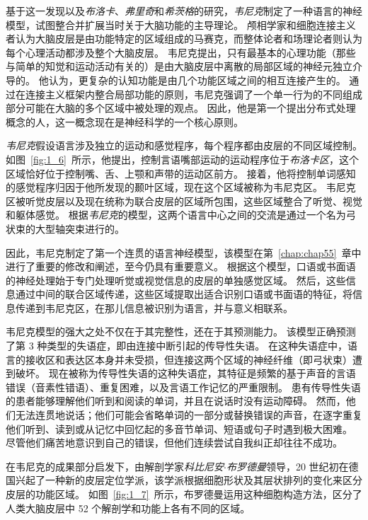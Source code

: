 基于这一发现以及\textit{布洛卡}、\textit{弗里奇}和\textit{希茨格}的研究，\textit{韦尼克}制定了一种语言的神经模型，试图整合并扩展当时关于大脑功能的主导理论。
颅相学家和细胞连接主义者认为大脑皮层是由功能特定的区域组成的马赛克，而整体论者和场理论者则认为每个心理活动都涉及整个大脑皮层。
韦尼克提出，只有最基本的心理功能（那些与简单的知觉和运动活动有关的）是由大脑皮层中离散的局部区域的神经元独立介导的。
他认为，更复杂的认知功能是由几个功能区域之间的相互连接产生的。
通过在连接主义框架内整合局部功能的原则，韦尼克强调了一个单一行为的不同组成部分可能在大脑的多个区域中被处理的观点。
因此，他是第一个提出分布式处理概念的人，这一概念现在是神经科学的一个核心原则。




\textit{韦尼克}假设语言涉及独立的运动和感觉程序，每个程序都由皮层的不同区域控制。
如图~\ref{fig:1_6}~所示，他提出，控制言语嘴部运动的运动程序位于\textit{布洛卡区}，这个区域恰好位于控制嘴、舌、上颚和声带的运动区前方。
接着，他将控制单词感知的感觉程序归因于他所发现的颞叶区域，现在这个区域被称为韦尼克区。
韦尼克区被听觉皮层以及现在统称为联合皮层的区域所包围，这些区域整合了听觉、视觉和躯体感觉。
根据\textit{韦尼克}的模型，这两个语言中心之间的交流是通过一个名为弓状束的大型轴突束进行的。



因此，韦尼克制定了第一个连贯的语言神经模型，该模型在第~\ref{chap:chap55}~章中进行了重要的修改和阐述，至今仍具有重要意义。
根据这个模型，口语或书面语的神经处理始于专门处理听觉或视觉信息的皮层的单独感觉区域。
然后，这些信息通过中间的联合区域传递，这些区域提取出适合识别口语或书面语的特征，将信息传递到韦尼克区，在那儿信息被识别为语言，并与意义相联系。




韦尼克模型的强大之处不仅在于其完整性，还在于其预测能力。
该模型正确预测了第 3 种类型的失语症，即由连接中断引起的传导性失语。
在这种失语症中，语言的接收区和表达区本身并未受损，但连接这两个区域的神经纤维（即弓状束）遭到破坏。
现在被称为传导性失语的这种失语症，其特征是频繁的基于声音的言语错误（音素性错语）、重复困难，以及言语工作记忆的严重限制。
患有传导性失语的患者能够理解他们听到和阅读的单词，并且在说话时没有运动障碍。
然而，他们无法连贯地说话；他们可能会省略单词的一部分或替换错误的声音，在逐字重复他们听到、读到或从记忆中回忆起的多音节单词、短语或句子时遇到极大困难。
尽管他们痛苦地意识到自己的错误，但他们连续尝试自我纠正却往往不成功。





在韦尼克的成果部分启发下，由解剖学家\textit{科比尼安$\cdot$布罗德曼}领导，20 世纪初在德国兴起了一种新的皮层定位学派，该学派根据细胞形状及其层状排列的变化来区分皮层的功能区域。
如图~\ref{fig:1_7}~所示，布罗德曼运用这种细胞构造方法，区分了人类大脑皮层中 52 个解剖学和功能上各有不同的区域。




